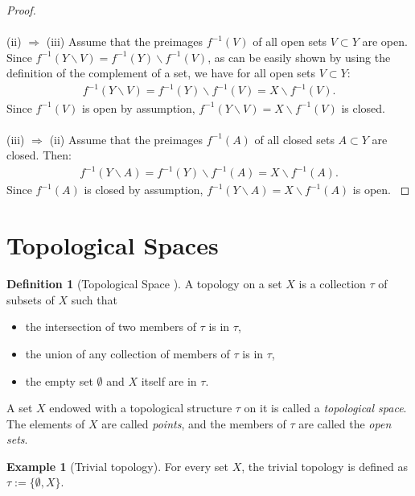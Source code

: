 \documentclass[12pt, a4paper]{article}
\numberwithin{equation}{section}
\theoremstyle{definition}
\theoremstyle{definition}
\newtheorem{defn}[thm]{Definition} %
\newtheorem{exmp}[thm]{Example} %
\begin{document}
\begin{proof}
		\\ 
		\\
		(ii) $\Rightarrow$ (iii) Assume that the preimages $f^{-1}(V)$ of all open sets $V\subset Y$ are open. Since $f^{-1}(Y\backslash V) = f^{-1}(Y)\backslash f^{-1}(V)$, as can be easily shown by using the definition of the complement of a set, we have for all open sets $V \subset Y$: 
		\begin{align}
			f^{-1}(Y\backslash V) = f^{-1}(Y)\backslash f^{-1}(V) = X\backslash f^{-1}(V). 
		\end{align}
		Since $f^{-1}(V)$ is open by assumption, $f^{-1}(Y\backslash V) = X\backslash f^{-1}(V)$ is closed. 
		\\ 
		\\
		(iii) $\Rightarrow$ (ii) Assume that the preimages $f^{-1}(A)$
		of all closed sets $A\subset Y$ are closed. Then: 
		\begin{align}
			f^{-1}(Y\backslash A) = f^{-1}(Y)\backslash f^{-1}(A) = X\backslash f^{-1}(A). 
		\end{align}
		Since $f^{-1}(A)$ is closed by assumption, $f^{-1}(Y\backslash A) = X\backslash f^{-1}(A)$ is open. \cite{preimage-of-closed-sets}
	\end{proof} 
	
	\newpage
	\section{Topological Spaces}
		\begin{defn}[Topological Space \cite{topology-singh}]
			A topology on a set $X$ is a collection $\tau$ of subsets of $X$ such that 
			\begin{itemize}
				\item the intersection of two members of $\tau$ is in $\tau$, 
				\item the union of any collection of members of $\tau$ is in $\tau$, 
				\item the empty set $\emptyset$ and $X$ itself are in $\tau$.
			\end{itemize}
			A set $X$ endowed with a topological structure $\tau$ on it is called a \textit{topological space}. The elements of $X$ are called \textit{points}, and the members of $\tau$ are called the \textit{open sets}. 
		\end{defn} 
	
		\begin{exmp}[Trivial topology]
			For every set $X$, the trivial topology is defined as $\tau := \{\emptyset, X\}$.
		\end{exmp}
	
\end{document}
